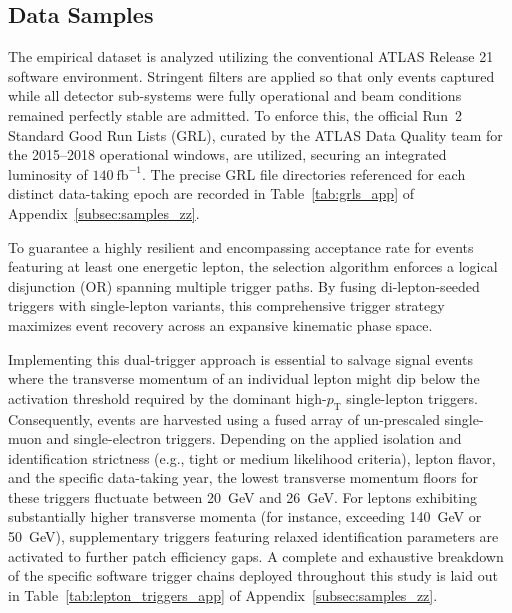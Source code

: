 \subsection{Data Samples}

The empirical dataset is analyzed utilizing the conventional ATLAS Release 21 software environment. Stringent filters are applied so that only events captured while all detector sub-systems were fully operational and beam conditions remained perfectly stable are admitted. To enforce this, the official Run~2 Standard Good Run Lists (GRL), curated by the ATLAS Data Quality team for the 2015--2018 operational windows, are utilized, securing an integrated luminosity of $140~\text{fb}^{-1}$. The precise GRL file directories referenced for each distinct data-taking epoch are recorded in Table~\ref{tab:grls_app} of Appendix~\ref{subsec:samples_zz}.

To guarantee a highly resilient and encompassing acceptance rate for events featuring at least one energetic lepton, the selection algorithm enforces a logical disjunction (OR) spanning multiple trigger paths. By fusing di-lepton-seeded triggers with single-lepton variants, this comprehensive trigger strategy maximizes event recovery across an expansive kinematic phase space. 

Implementing this dual-trigger approach is essential to salvage signal events where the transverse momentum of an individual lepton might dip below the activation threshold required by the dominant high-$p_{\text{T}}$ single-lepton triggers. Consequently, events are harvested using a fused array of un-prescaled single-muon and single-electron triggers. Depending on the applied isolation and identification strictness (e.g., tight or medium likelihood criteria), lepton flavor, and the specific data-taking year, the lowest transverse momentum floors for these triggers fluctuate between 20~GeV and 26~GeV. For leptons exhibiting substantially higher transverse momenta (for instance, exceeding 140~GeV or 50~GeV), supplementary triggers featuring relaxed identification parameters are activated to further patch efficiency gaps. A complete and exhaustive breakdown of the specific software trigger chains deployed throughout this study is laid out in Table~\ref{tab:lepton_triggers_app} of Appendix~\ref{subsec:samples_zz}.